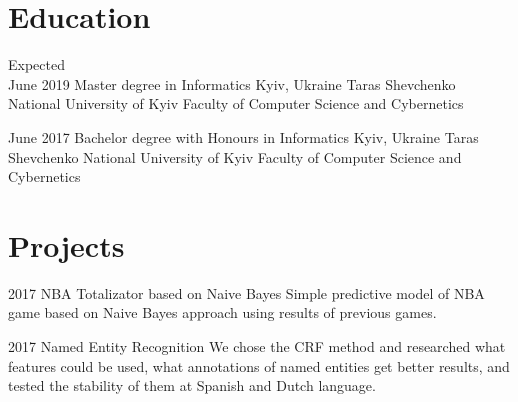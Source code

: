 \documentclass[letterpaper]{twentysecondcv} %
\begin{document}
\makeprofile %

\section{Education}

\begin{twenty} %
	\twentyitem
    	{Expected \\ June 2019}
        {Master degree in Informatics}
        {Kyiv, Ukraine}
        {Taras Shevchenko National University of Kyiv}
        {Faculty of Computer Science and Cybernetics}
        
	\twentyitem
    	{June 2017}
        {Bachelor degree with Honours in Informatics}
        {Kyiv, Ukraine}
        {Taras Shevchenko National University of Kyiv}
        {Faculty of Computer Science and Cybernetics}
        
\end{twenty}





\section{Projects}
\begin{twenty}
	\twentyitem
    	{2017}
        {NBA Totalizator based on Naive Bayes}
        {}
        {}
        {Simple predictive model of NBA game based on Naive Bayes approach using results of previous games.}
\end{twenty}
\begin{twenty}
	\twentyitem
    	{2017}
        {Named Entity Recognition}
        {}
        {}
        {We chose the CRF method and researched what features could be used, what annotations of named entities get better results, and tested the stability of them at Spanish and Dutch language. }
\end{twenty}

\end{document}
